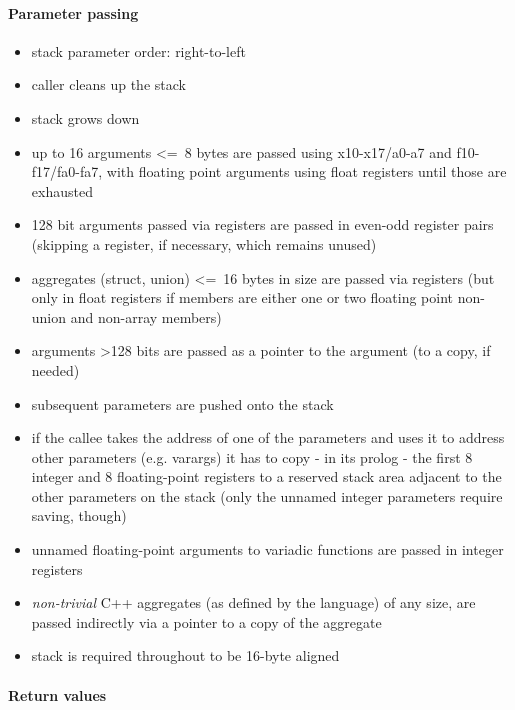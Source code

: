 \paragraph{Parameter passing}

\begin{itemize}
\item stack parameter order: right-to-left
\item caller cleans up the stack
\item stack grows down
\item up to 16 arguments \textless=\ 8 bytes are passed using x10-x17/a0-a7 and f10-f17/fa0-fa7, with floating point arguments using float registers until those are exhausted
\item 128 bit arguments passed via registers are passed in even-odd register pairs (skipping a register, if necessary, which remains unused)
\item aggregates (struct, union) \textless=\ 16 bytes in size are passed via registers (but only in float registers if members are either one or two floating point non-union and non-array members)
\item arguments \textgreater 128 bits are passed as a pointer to the argument (to a copy, if needed)
\item subsequent parameters are pushed onto the stack
\item if the callee takes the address of one of the parameters and uses it to address other parameters (e.g. varargs) it has to copy - in its prolog - the first 8 integer
and 8 floating-point registers to a reserved stack area adjacent to the other parameters on the stack (only the unnamed integer parameters require saving, though)
\item unnamed floating-point arguments to variadic functions are passed in integer registers
\item {\it non-trivial} C++ aggregates (as defined by the language) of any size, are passed indirectly via a pointer to a copy of the aggregate
\item stack is required throughout to be 16-byte aligned
\end{itemize}

\paragraph{Return values}


